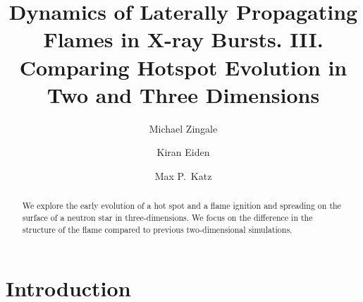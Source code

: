 \documentclass[preprint,times,tighten]{aastex631}
\begin{document}
\title{Dynamics of Laterally Propagating Flames in X-ray Bursts. III. Comparing Hotspot Evolution in Two and Three Dimensions}


\author[0000-0001-8401-030X]{Michael Zingale}


\author[0000-0001-6191-4285]{Kiran Eiden}



\author[0000-0003-0439-4556]{Max P.\ Katz}




\begin{abstract}
We explore the early evolution of a hot spot and a flame ignition and
spreading on the surface of a neutron star in three-dimensions.  We
focus on the difference in the structure of the flame compared to
previous two-dimensional simulations.\end{abstract}


\section{Introduction}\label{Sec:Introduction}
\end{document}
